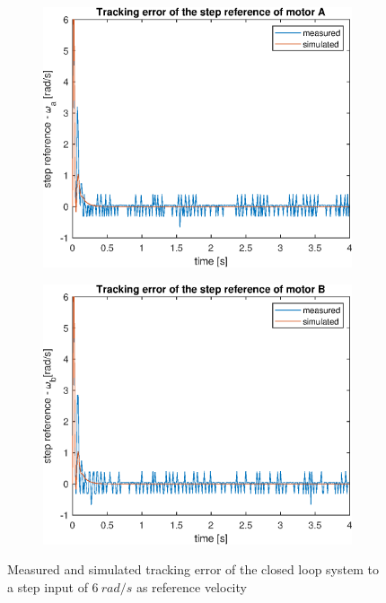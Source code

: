 \documentclass[a4paper,kul]{kulakarticle} %
\begin{document}
\begin{figure}[htp!]
	\centering
	\begin{subfigure}[b]{0.49\textwidth}
		\centering
		\includegraphics[width=\linewidth]{trackingerror_stepresponseA.eps}
		
	\end{subfigure}
	\hfill
	\begin{subfigure}[b]{0.49\textwidth}  
		\centering
		\includegraphics[width=\linewidth]{trackingerror_stepresponseB.eps}
		
	\end{subfigure}
	\caption{Measured and simulated tracking error of the closed loop system to a step input of $\SI{6}{rad/s}$ as reference velocity}
	\label{fig:trackingerrorstepresponse}
\end{figure}
\end{document}
